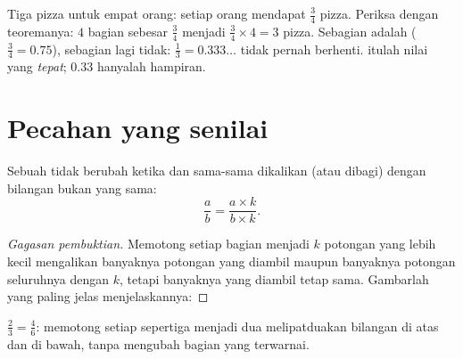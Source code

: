 \begin{example}\label{ex:g6:fractions:pizzas}
Tiga pizza untuk empat orang: setiap orang mendapat $\frac34$ pizza.
Periksa dengan teoremanya: $4$ bagian sebesar $\frac34$ menjadi
$\frac34 \times 4 = 3$ pizza. Sebagian  adalah 
($\frac34 = 0.75$), sebagian lagi tidak: $\frac13 = 0.333\dots$ tidak
pernah berhenti.  itulah nilai yang \emph{tepat}; $0.33$
hanyalah hampiran.
\end{example}

\section{Pecahan yang senilai}

\begin{proposition}\label{prop:g6:fractions:equal}
Sebuah  tidak berubah ketika  dan 
sama-sama dikalikan (atau dibagi) dengan bilangan bukan  yang sama:
\[
\frac{a}{b} = \frac{a \times k}{b \times k} .
\]
\end{proposition}

\begin{proof}[Gagasan pembuktian]
Memotong setiap bagian menjadi $k$ potongan yang lebih kecil
mengalikan banyaknya potongan yang diambil maupun banyaknya potongan
seluruhnya dengan $k$, tetapi banyaknya yang diambil tetap sama.
Gambarlah yang paling jelas menjelaskannya:
\end{proof}

\begin{omfigure}

{\small $\frac23 = \frac46$: memotong setiap sepertiga menjadi dua
melipatduakan bilangan di atas dan di bawah, tanpa mengubah bagian yang terwarnai.}
\end{omfigure}

